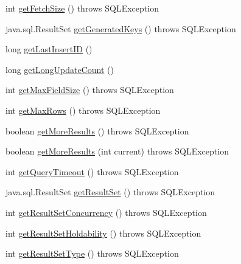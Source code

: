 \begin{DoxyCompactItemize}
\item 
int \mbox{\hyperlink{classcom_1_1mysql_1_1cj_1_1jdbc_1_1_statement_impl_a2e309596729b0de9bc9230e745c9350f}{get\+Fetch\+Size}} ()  throws S\+Q\+L\+Exception 
\item 
java.\+sql.\+Result\+Set \mbox{\hyperlink{classcom_1_1mysql_1_1cj_1_1jdbc_1_1_statement_impl_a498dcb08802ab5ebfb700b3bae3ff1f2}{get\+Generated\+Keys}} ()  throws S\+Q\+L\+Exception 
\item 
long \mbox{\hyperlink{classcom_1_1mysql_1_1cj_1_1jdbc_1_1_statement_impl_af48b4bdf41d529d92def194cbe611acf}{get\+Last\+Insert\+ID}} ()
\item 
long \mbox{\hyperlink{classcom_1_1mysql_1_1cj_1_1jdbc_1_1_statement_impl_a05b7122d9eb36876362b1e526e9dfd38}{get\+Long\+Update\+Count}} ()
\item 
int \mbox{\hyperlink{classcom_1_1mysql_1_1cj_1_1jdbc_1_1_statement_impl_a1dbdd8b00e13cbaadf54920e8d93075d}{get\+Max\+Field\+Size}} ()  throws S\+Q\+L\+Exception 
\item 
int \mbox{\hyperlink{classcom_1_1mysql_1_1cj_1_1jdbc_1_1_statement_impl_ae2447bc18fbb4aba8ef64f48f0c90c36}{get\+Max\+Rows}} ()  throws S\+Q\+L\+Exception 
\item 
boolean \mbox{\hyperlink{classcom_1_1mysql_1_1cj_1_1jdbc_1_1_statement_impl_a0791ff241a89529adb0be7da26a0ec62}{get\+More\+Results}} ()  throws S\+Q\+L\+Exception 
\item 
boolean \mbox{\hyperlink{classcom_1_1mysql_1_1cj_1_1jdbc_1_1_statement_impl_a2cf53265012d4410f8090334c4837e81}{get\+More\+Results}} (int current)  throws S\+Q\+L\+Exception 
\item 
int \mbox{\hyperlink{classcom_1_1mysql_1_1cj_1_1jdbc_1_1_statement_impl_acc6d1eb26165bde353224ca1c5d9f4cb}{get\+Query\+Timeout}} ()  throws S\+Q\+L\+Exception 
\item 
java.\+sql.\+Result\+Set \mbox{\hyperlink{classcom_1_1mysql_1_1cj_1_1jdbc_1_1_statement_impl_a8bf30f2ecfd13ebcfbde03b082172bb1}{get\+Result\+Set}} ()  throws S\+Q\+L\+Exception 
\item 
int \mbox{\hyperlink{classcom_1_1mysql_1_1cj_1_1jdbc_1_1_statement_impl_a4a5fa990b06601f984e4393d6cb02b26}{get\+Result\+Set\+Concurrency}} ()  throws S\+Q\+L\+Exception 
\item 
int \mbox{\hyperlink{classcom_1_1mysql_1_1cj_1_1jdbc_1_1_statement_impl_a84b0f5b22d3ce2bd808aceb6c17e4620}{get\+Result\+Set\+Holdability}} ()  throws S\+Q\+L\+Exception 
\item 
int \mbox{\hyperlink{classcom_1_1mysql_1_1cj_1_1jdbc_1_1_statement_impl_a0845a6219a16770f3675269fc28ade3b}{get\+Result\+Set\+Type}} ()  throws S\+Q\+L\+Exception 

\end{DoxyCompactItemize}
